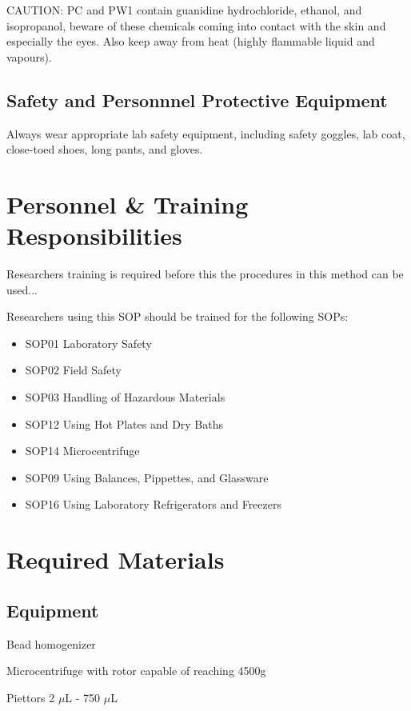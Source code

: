\documentclass[12pt]{../SOP3_alpha}\usepackage[]{graphicx}\usepackage[]{color}
\begin{document}
\NP CAUTION: PC and PW1 contain guanidine hydrochloride, ethanol, and isopropanol, beware of these chemicals coming into contact with the skin and especially the eyes. Also keep away from heat (highly flammable liquid and vapours).

\subsection{Safety and Personnnel Protective Equipment}

\NP Always wear appropriate lab safety equipment, including safety goggles, lab coat, close-toed shoes, long pants, and gloves. 

\section{Personnel \& Training Responsibilities}

\NP Researchers training is required before this the procedures in this method can be used... 

\NP Researchers using this SOP should be trained for the following SOPs:

\begin{itemize}
  \item SOP01 Laboratory Safety
  \item SOP02 Field Safety
  \item SOP03 Handling of Hazardous Materials
  \item SOP12 Using Hot Plates and Dry Baths
  \item SOP14 Microcentrifuge
  \item SOP09 Using Balances, Pippettes, and Glassware
  \item SOP16 Using Laboratory Refrigerators and Freezers
\end{itemize}


\section{Required Materials}

\subsection{Equipment}

\NP Bead homogenizer

\NP Microcentrifuge with rotor capable of reaching 4500g

\NP Piettors 2 $\mu$L - 750 $\mu$L
\end{document}

